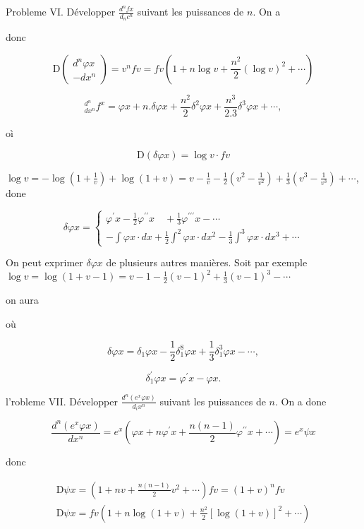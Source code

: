 \documentclass{article}
\begin{document}
Probleme VI. Développer \(\frac{d^{n} f x}{d_{n} c^{n}}\) suivant les puissances de \(n\). On a

donc

\[
\mathrm{D}\left(\begin{array}{c}
d^{n} \varphi x \\
-d x^{n}
\end{array}\right)=v^{n} f v=f v\left(1+n \log v+\frac{n^{2}}{2}(\log v)^{2}+\cdots\right)
\]

\[
{ }_{d x^{n}}^{d^{n}} f^{x}=\varphi x+n . \delta \varphi x+\frac{n^{2}}{2} \delta^{2} \varphi x+\frac{n^{3}}{2.3} \delta^{3} \varphi x+\cdots,
\]

oì

\[
\mathrm{D}(\delta \varphi x)=\log v \cdot f v
\]

\(\log v=-\log \left(1+\frac{1}{v}\right)+\log (1+v)=v-\frac{1}{v}-\frac{1}{2}\left(v^{2}-\frac{1}{v^{2}}\right)+\frac{1}{3}\left(v^{3}-\frac{1}{v^{3}}\right)+\cdots\), done

\[
\delta \varphi x=\left\{\begin{array}{c}
\varphi^{\prime} x-\frac{1}{2} \varphi^{\prime \prime} x \quad+\frac{1}{3} \varphi^{\prime \prime \prime} x-\cdots \\
-\int \varphi x \cdot d x+\frac{1}{2} \int^{2} \varphi x \cdot d x^{2}-\frac{1}{3} \int^{3} \varphi x \cdot d x^{3}+\cdots
\end{array}\right.
\]

On peut exprimer \(\delta \varphi x\) de plusieurs autres manières. Soit par exemple \(\log v=\log (1+v-1)=v-1-\frac{1}{2}(v-1)^{2}+\frac{1}{3}(v-1)^{3}-\cdots\)

on aura

où

\[
\delta \varphi x=\delta_{1} \varphi x-\frac{1}{2} \delta_{1}^{8} \varphi x+\frac{1}{3} \delta_{1}^{3} \varphi x-\cdots,
\]

\[
\delta_{1}^{\prime} \varphi x=\varphi^{\prime} x-\varphi x .
\]

l'robleme VII. Développer \(\frac{d^{n}\left(e^{x} \varphi x\right)}{d_{i} x^{n}}\) suivant les puissances de \(n\). On a
done

\[
\frac{d^{n}\left(e^{x} \varphi x\right)}{d x^{n}}=e^{x}\left(\varphi x+n \varphi^{\prime} x+\frac{n(n-1)}{2} \varphi^{\prime \prime} x+\cdots\right)=e^{x} \psi x
\]

donc

\[
\begin{gathered}
\mathrm{D} \psi x=\left(1+n v+\frac{n(n-1)}{2} v^{2}+\cdots\right) f v=(1+v)^{n} f v \\
\mathrm{D} \psi x=f v\left(1+n \log (1+v)+\frac{n^{2}}{2}[\log (1+v)]^{2}+\cdots\right)
\end{gathered}
\]
\end{document}
